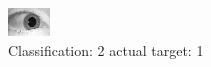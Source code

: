 \begin{figure}[h!]
\begin{center}
\includegraphics[width=0.60\columnwidth]{figures/ID1577_class_2_target_1.png}
\end{center}
\caption{ Classification: 2 actual target: 1}
\label{fig:ID1577_class_2_target_1}
\end{figure}
